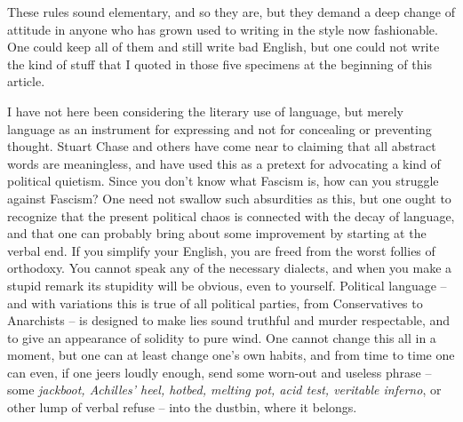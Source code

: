 \documentclass[article,twoside,a4paper]{memoir}
\begin{document}
These rules sound elementary, and so they are, but they demand a deep change of
attitude in anyone who has grown used to writing in the style now fashionable. One could
keep all of them and still write bad English, but one could not write the kind of stuff
that I quoted in those five specimens at the beginning of this article.

I have not here been considering the literary use of language, but merely language
as an instrument for expressing and not for concealing or preventing thought.
Stuart Chase and others have come near to claiming that all abstract words are
meaningless, and have used this as a pretext for advocating a kind of political
quietism. Since you don't know what Fascism is, how can you struggle against
Fascism? One need not swallow such absurdities as this, but one ought to recognize
that the present political chaos is connected with the decay of language, and
that one can probably bring about some improvement by starting at the verbal
end. If you simplify your English, you are freed from the worst follies of orthodoxy.
You cannot speak any of the necessary dialects, and when you make a stupid remark
its stupidity will be obvious, even to yourself. Political language -- and with
variations this is true of all political parties, from Conservatives to Anarchists
-- is designed to make lies sound truthful and murder respectable, and to give
an appearance of solidity to pure wind. One cannot change this all in a moment,
but one can at least change one's own habits, and from time to time one can
even, if one jeers loudly enough, send some worn-out and useless phrase -- some
\emph{jackboot, Achilles' heel, hotbed, melting pot, acid test, veritable inferno},
or other lump of verbal refuse -- into the dustbin, where it belongs.
\end{document}
